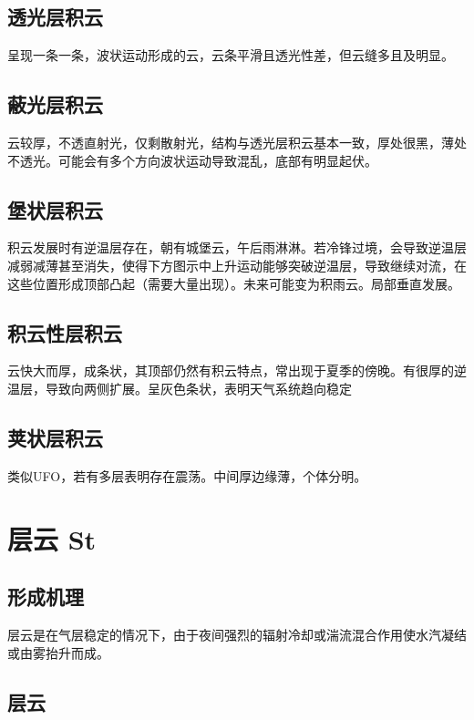 \documentclass[UTF8,11pt]{ctexbook}
\begin{document}
\subsection{透光层积云}

呈现一条一条，波状运动形成的云，云条平滑且透光性差，但云缝多且及明显。

\subsection{蔽光层积云}

云较厚，不透直射光，仅剩散射光，结构与透光层积云基本一致，厚处很黑，薄处不透光。可能会有多个方向波状运动导致混乱，底部有明显起伏。

\subsection{堡状层积云}

积云发展时有逆温层存在，朝有城堡云，午后雨淋淋。若冷锋过境，会导致逆温层减弱减薄甚至消失，使得下方图示中上升运动能够突破逆温层，导致继续对流，在这些位置形成顶部凸起（需要大量出现）。未来可能变为积雨云。局部垂直发展。

\subsection{积云性层积云}

云快大而厚，成条状，其顶部仍然有积云特点，常出现于夏季的傍晚。有很厚的逆温层，导致向两侧扩展。呈灰色条状，表明天气系统趋向稳定

\subsection{荚状层积云}

类似UFO，若有多层表明存在震荡。中间厚边缘薄，个体分明。

\section{层云 St}

\subsection{形成机理}

层云是在气层稳定的情况下，由于夜间强烈的辐射冷却或湍流混合作用使水汽凝结或由雾抬升而成。

\subsection{层云}
\end{document}
